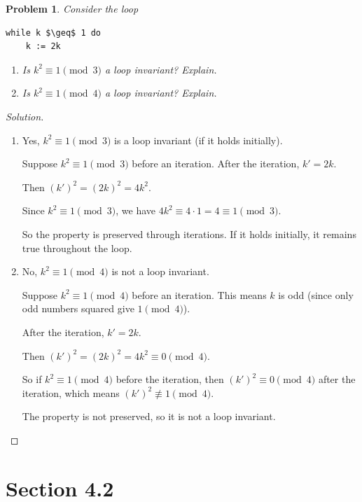 \documentclass[12pt]{article}
\newtheorem{problem}{Problem}
\begin{document}
\setcounter{problem}{11}
\begin{problem}
Consider the loop
\begin{lstlisting}[mathescape=true]
while k $\geq$ 1 do
    k := 2k
\end{lstlisting}

\begin{enumerate}[label=(\alph*)]
    \item Is $k^2 \equiv 1 \pmod{3}$ a loop invariant? Explain.
    
    \item Is $k^2 \equiv 1 \pmod{4}$ a loop invariant? Explain.
\end{enumerate}
\end{problem}

\begin{proof}[Solution]
~
\begin{enumerate}[label=(\alph*)]
    \item Yes, $k^2 \equiv 1 \pmod{3}$ is a loop invariant (if it holds initially).
    
    Suppose $k^2 \equiv 1 \pmod{3}$ before an iteration. After the iteration, $k' = 2k$.
    
    Then $(k')^2 = (2k)^2 = 4k^2$.
    
    Since $k^2 \equiv 1 \pmod{3}$, we have $4k^2 \equiv 4 \cdot 1 = 4 \equiv 1 \pmod{3}$.
    
    So the property is preserved through iterations. If it holds initially, it remains true throughout the loop.
    
    \item No, $k^2 \equiv 1 \pmod{4}$ is not a loop invariant.
    
    Suppose $k^2 \equiv 1 \pmod{4}$ before an iteration. This means $k$ is odd (since only odd numbers squared give $1 \pmod{4}$).
    
    After the iteration, $k' = 2k$.
    
    Then $(k')^2 = (2k)^2 = 4k^2 \equiv 0 \pmod{4}$.
    
    So if $k^2 \equiv 1 \pmod{4}$ before the iteration, then $(k')^2 \equiv 0 \pmod{4}$ after the iteration, which means $(k')^2 \not\equiv 1 \pmod{4}$.
    
    The property is not preserved, so it is not a loop invariant.
\end{enumerate}
\end{proof}
\newpage
\section*{Section 4.2}
\end{document}
